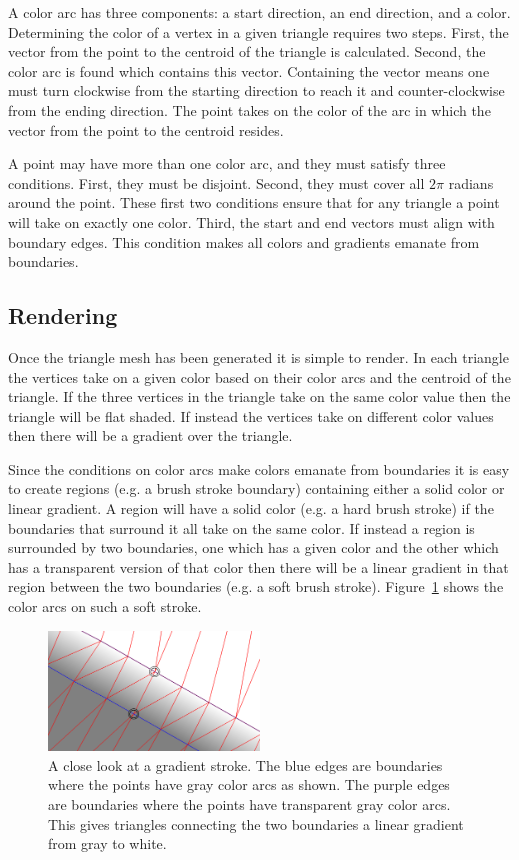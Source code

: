 \documentclass[review]{acmsiggraph}
\begin{document}
A color arc has three components: a start direction, an end direction, and a color. 
Determining the color of a vertex in a given triangle requires two steps. First,
the vector from the point to the centroid of the triangle is calculated. Second,
the color arc is found which contains this vector. Containing the vector means one must turn
clockwise from the starting direction to reach it and counter-clockwise from the ending direction.
The point takes on the color of the arc in which the vector from the point to the centroid resides.

A point may have more than one color arc, and they must satisfy three conditions. First, they must be disjoint. Second,
they must cover all $2\pi$ radians around the point. These first two conditions ensure that for any
triangle a point will take on exactly one color. Third, the start and end vectors must align
with boundary edges. This condition makes all colors and gradients emanate from boundaries.

\subsection{Rendering}
Once the triangle mesh has been generated it is simple to render. In each triangle the vertices
take on a given color based on their color arcs and the centroid of the triangle. If the three
vertices in the triangle take on the same color value then the triangle will be flat shaded. If instead the 
vertices take on different color values then there will be a gradient over the triangle.

Since the conditions on color arcs make colors emanate from boundaries it is easy to create regions (e.g. a brush stroke boundary)
containing either a solid color or linear gradient. A region will have a solid color (e.g. a hard brush stroke) if the
boundaries that surround it all take on the same color. If instead a region is surrounded by
two boundaries, one which has a given color and the other which has a transparent version of that color
then there will be a linear gradient in that region between the two boundaries (e.g. a soft brush stroke).
Figure~\ref{fig:softarcs} shows the color arcs on such a soft stroke.

\begin{figure}
    \centering
        \includegraphics[width=0.5\textwidth]{images/gradientarcs}
    \caption{A close look at a gradient stroke. The blue edges are boundaries where
    the points have gray color arcs as shown. The purple edges are boundaries where
    the points have transparent gray color arcs. This gives triangles connecting the two boundaries
    a linear gradient from gray to white.}
    \label{fig:softarcs}
\end{figure}
\end{document}
